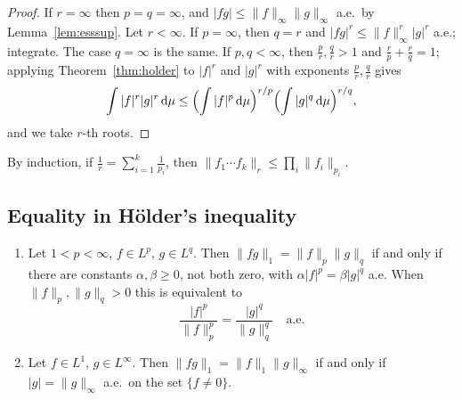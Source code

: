 \documentclass[11pt]{article}
\newcommand{\norm}[1]{\lVert #1\rVert}
\newcommand{\dmu}{\,\mathrm{d}\mu}
\begin{document}
\begin{proof}
If $r=\infty$ then $p=q=\infty$, and $|fg|\le\norm{f}_{\infty}\norm{g}_{\infty}$ a.e.\ by Lemma~\ref{lem:esssup}. Let $r<\infty$. If $p=\infty$, then $q=r$ and $|fg|^{r}\le\norm{f}_{\infty}^{r}|g|^{r}$ a.e.; integrate. The case $q=\infty$ is the same. If $p,q<\infty$, then $\frac{p}{r},\frac{q}{r}>1$ and $\frac{r}{p}+\frac{r}{q}=1$; applying Theorem~\ref{thm:holder} to $|f|^{r}$ and $|g|^{r}$ with exponents $\frac pr,\frac qr$ gives
\[
\int|f|^{r}|g|^{r}\dmu\le\Bigl(\int|f|^{p}\dmu\Bigr)^{r/p}\Bigl(\int|g|^{q}\dmu\Bigr)^{r/q},
\]
and we take $r$-th roots.
\end{proof}

By induction, if $\frac1r=\sum_{i=1}^{k}\frac{1}{p_{i}}$, then $\norm{f_{1}\cdots f_{k}}_{r}\le\prod_{i}\norm{f_{i}}_{p_{i}}$.

\subsection{Equality in Hölder's inequality}

\begin{theorem}\label{thm:holder-eq}
\begin{enumerate}
\item Let $1<p<\infty$, $f\in L^{p}$, $g\in L^{q}$. Then $\norm{fg}_{1}=\norm{f}_{p}\norm{g}_{q}$ if and only if there are constants $\alpha,\beta\ge0$, not both zero, with $\alpha|f|^{p}=\beta|g|^{q}$ a.e. When $\norm{f}_{p},\norm{g}_{q}>0$ this is equivalent to
\[
\frac{|f|^{p}}{\norm{f}_{p}^{p}}=\frac{|g|^{q}}{\norm{g}_{q}^{q}}\quad\text{a.e.}
\]
\item Let $f\in L^{1}$, $g\in L^{\infty}$. Then $\norm{fg}_{1}=\norm{f}_{1}\norm{g}_{\infty}$ if and only if $|g|=\norm{g}_{\infty}$ a.e.\ on the set $\{f\ne0\}$.
\end{enumerate}
\end{theorem}
\end{document}

